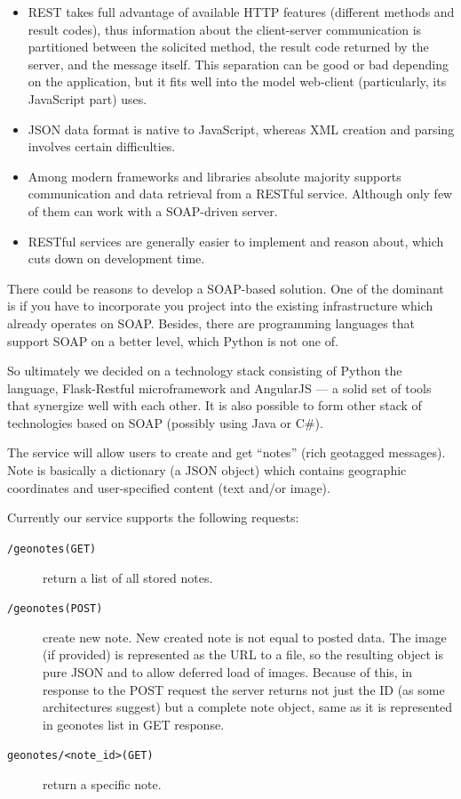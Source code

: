 \documentclass[12pt,a4paper]{article}
\begin{document}
\begin{itemize}
\item REST takes full advantage of available HTTP features (different
  methods and result codes), thus information about the client-server
  communication is partitioned between the solicited method, the
  result code returned by the server, and the message itself. This
  separation can be good or bad depending on the application, but it
  fits well into the model web-client (particularly, its JavaScript
  part) uses.
\item JSON data format is native to JavaScript, whereas XML creation
  and parsing involves certain difficulties.
\item Among modern frameworks and libraries absolute majority supports
  communication and data retrieval from a RESTful service. Although
  only few of them can work with a SOAP-driven server.
\item RESTful services are generally easier to implement and reason
  about, which cuts down on development time.
\end{itemize}

There could be reasons to develop a SOAP-based solution. One of the
dominant is if you have to incorporate you project into the existing
infrastructure which already operates on SOAP\@. Besides, there are
programming languages that support SOAP on a better level, which
Python is not one of.

So ultimately we decided on a technology stack consisting of Python
the language, Flask-Restful microframework and AngularJS --- a solid
set of tools that synergize well with each other. It is also possible
to form other stack of technologies based on SOAP (possibly using Java
or C\#).

The service will allow users to create and get ``notes'' (rich geotagged
messages). Note is basically a dictionary (a JSON object) which
contains geographic coordinates and user-specified content (text
and/or image).

Currently our service supports the following requests:

\begin{description}
\item[\texttt{/geonotes(GET)}] return a list of all stored notes.
\item[\texttt{/geonotes(POST)}] create new note. New created note
  is not equal to posted data. The image (if
  provided) is represented as the URL to a file, so the resulting object is
  pure JSON and to allow deferred load of images.
  Because of this, in response to the POST request the server returns
  not just the ID (as some architectures suggest) but a complete note
  object, same as it is represented in geonotes list in GET response.
\item[\texttt{geonotes/<note\_id>(GET)}] return a specific note.
\end{description}
\end{document}
